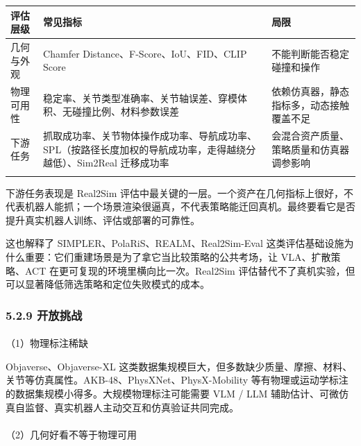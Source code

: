 \documentclass[
  chinese,
]{ctexart}
\makeatletter
\let\oldparagraph\paragraph
\renewcommand{\paragraph}{
    \@ifstar
      \xxxParagraphStar
      \xxxParagraphNoStar
  }
\newcommand{\xxxParagraphStar}[1]{\oldparagraph*{#1}\mbox{}}
\newcommand{\xxxParagraphNoStar}[1]{\oldparagraph{#1}\mbox{}}
\makeatother
\begin{document}
\begin{center}
\begin{tabular}{@{}>{\raggedright\arraybackslash}p{} >{\raggedright\arraybackslash}p{} >{\raggedright\arraybackslash}p{}@{}}
\toprule\noalign{}
评估层级 & 常见指标 & 局限 \\
\midrule\noalign{}
几何与外观 & Chamfer Distance、F-Score、IoU、FID、CLIP Score & 不能判断能否稳定碰撞和操作 \\
物理可用性 & 稳定率、关节类型准确率、关节轴误差、穿模体积、无碰撞比例、材料参数误差 & 依赖仿真器，静态指标多，动态接触覆盖不足 \\
下游任务 & 抓取成功率、关节物体操作成功率、导航成功率、SPL（按路径长度加权的导航成功率，走得越绕分越低）、Sim2Real 迁移成功率 & 会混合资产质量、策略质量和仿真器调参影响 \\
\bottomrule\noalign{}
\end{tabular}
\end{center}

下游任务表现是 Real2Sim
评估中最关键的一层。一个资产在几何指标上很好，不代表机器人能抓；一个场景渲染很逼真，不代表策略能迁回真机。最终要看它是否提升真实机器人训练、评估或部署的可靠性。

这也解释了 SIMPLER、PolaRiS、REALM、Real2Sim-Eval
这类评估基础设施为什么重要：它们重建场景是为了拿它当比较策略的公共考场，让
VLA、扩散策略、ACT 在更可复现的环境里横向比一次。Real2Sim
评估替代不了真机实验，但可以显著降低筛选策略和定位失败模式的成本。

\subsubsection{5.2.9 开放挑战}\label{ux5f00ux653eux6311ux6218-1}

\paragraph{（1）物理标注稀缺}\label{ux7269ux7406ux6807ux6ce8ux7a00ux7f3a}

Objaverse、Objaverse-XL
这类数据集规模巨大，但多数缺少质量、摩擦、材料、关节等仿真属性。AKB-48、PhysXNet、PhysX-Mobility
等有物理或运动学标注的数据集规模小得多。大规模物理标注可能需要 VLM / LLM
辅助估计、可微仿真自监督、真实机器人主动交互和仿真验证共同完成。

\paragraph{（2）几何好看不等于物理可用}\label{ux51e0ux4f55ux597dux770bux4e0dux7b49ux4e8eux7269ux7406ux53efux7528}
\end{document}
